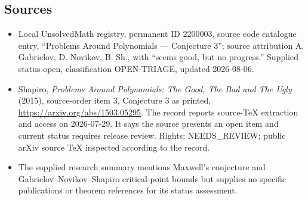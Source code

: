 \documentclass[11pt]{article}
\begin{document}
\subsection{Sources}
\begin{itemize}
\item Local UnsolvedMath registry, permanent ID 2200003, source code catalogue entry, ``Problems Around Polynomials --- Conjecture 3''; source attribution A. Gabrielov, D. Novikov, B. Sh., with ``seems good, but no progress.'' Supplied status open, classification OPEN-TRIAGE, updated 2026-08-06.
\item Shapiro, \emph{Problems Around Polynomials: The Good, The Bad and The Ugly} (2015), source-order item 3, Conjecture 3 as printed, \url{https://arxiv.org/abs/1503.05295}. The record reports source-TeX extraction and access on 2026-07-29. It says the source presents an open item and current status requires release review. Rights: NEEDS\_REVIEW; public arXiv source TeX inspected according to the record.
\item The supplied research summary mentions Maxwell's conjecture and Gabrielov--Novikov--Shapiro critical-point bounds but supplies no specific publications or theorem references for its status assessment.
\end{itemize}
\end{document}
